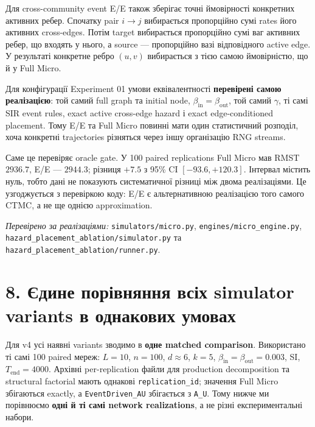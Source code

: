 \documentclass[11pt,a4paper]{article}
\begin{document}
Для cross-community event E/E також зберігає точні ймовірності конкретних активних ребер. Спочатку pair $i\to j$ вибирається пропорційно сумі rates його активних cross-edges. Потім target вибирається пропорційно сумі ваг активних ребер, що входять у нього, а source --- пропорційно вазі відповідного active edge. У результаті конкретне ребро $(u,v)$ вибирається з тією самою ймовірністю, що й у Full Micro.

\begin{tcolorbox}[colback=soft,colframe=exact,title={Отже, тут не треба писати ``if rules match''}]
Для конфігурації Experiment 01 умови еквівалентності \textbf{перевірені самою реалізацією}: той самий full graph та initial node, $\beta_{\mathrm{in}}=\beta_{\mathrm{out}}$, той самий $\gamma$, ті самі SIR event rules, exact active cross-edge hazard і exact edge-conditioned placement. Тому E/E та Full Micro повинні мати один статистичний розподіл, хоча конкретні trajectories різняться через іншу організацію RNG streams.
\end{tcolorbox}

Саме це перевіряє oracle gate. У 100 paired replications Full Micro мав RMST $2936.7$, E/E --- $2944.3$; різниця $+7.5$ з 95\% CI $[-93.6,+120.3]$. Інтервал містить нуль, тобто дані не показують систематичної різниці між двома реалізаціями. Це узгоджується з перевіркою коду: E/E є альтернативною реалізацією того самого CTMC, а не ще однією approximation.

\textit{Перевірено за реалізаціями:} \texttt{simulators/micro.py}, \texttt{engines/micro\_engine.py},\\
\texttt{hazard\_placement\_ablation/simulator.py} та \texttt{hazard\_placement\_ablation/runner.py}.

\section*{8. Єдине порівняння всіх simulator variants в однакових умовах}

Для v4 усі наявні variants зводимо в \textbf{одне matched comparison}. Використано ті самі 100 paired мереж: $L=10$, $n=100$, $d\approx6$, $k=5$, $\beta_{\mathrm{in}}=\beta_{\mathrm{out}}=0.003$, SI, $T_{\mathrm{end}}=4000$. Архівні per-replication файли для production decomposition та structural factorial мають однакові \texttt{replication\_id}; значення Full Micro збігаються exactly, а \texttt{EventDriven\_AU} збігається з \texttt{A\_U}. Тому нижче ми порівнюємо \textbf{одні й ті самі network realizations}, а не різні експериментальні набори.
\end{document}
